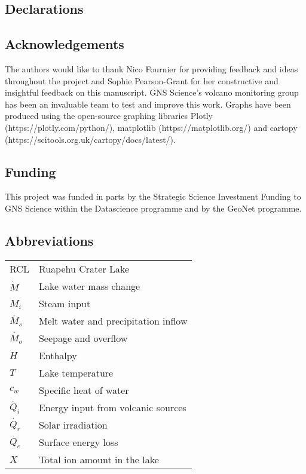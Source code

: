 \documentclass[doublespacing]{bmcart}
\begin{document}
\begin{backmatter}

\section*{Declarations}
\subsection*{Acknowledgements}
The authors would like to thank Nico Fournier for providing feedback and ideas
throughout the project and Sophie Pearson-Grant for her constructive and
insightful feedback on this manuscript. GNS Science's volcano monitoring group
has been an invaluable team to test and improve this work. Graphs have been
produced using the open-source graphing libraries Plotly
(https://plotly.com/python/), matplotlib (https://matplotlib.org/) and cartopy
(https://scitools.org.uk/cartopy/docs/latest/).

\subsection*{Funding}%
This project was funded in parts by the Strategic Science Investment Funding to
GNS Science within the Datascience programme and by the GeoNet programme.

\subsection*{Abbreviations}%
  \begin{tabular}{ll}
    RCL  & Ruapehu Crater Lake \\ 
    $\dot{M}$ & Lake water mass change \\
    $\dot{M_i}$ & Steam input \\ 
    $\dot{M_s}$ & Melt water and precipitation inflow \\
    $\dot{M_o}$ & Seepage and overflow \\ 
    $H$ & Enthalpy \\
    $T$ & Lake temperature \\
    $c_w$ & Specific heat of water \\
    $\dot{Q_i}$ & Energy input from volcanic sources \\
    $\dot{Q_r}$ & Solar irradiation \\
    $\dot{Q_e}$ & Surface energy loss \\
    $X$ & Total ion amount in the lake\\
  \end{tabular}


\end{backmatter}
\end{document}
